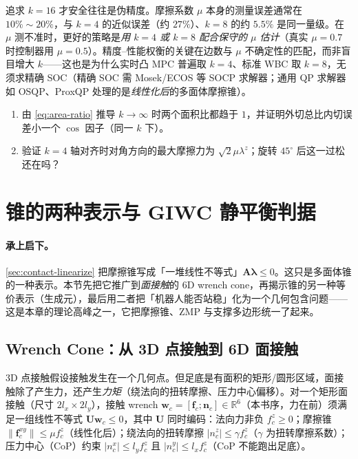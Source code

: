 \begin{insight}
追求 $k=16$ 才安全往往是伪精度。摩擦系数 $\mu$ 本身的测量误差通常在 $10\%\sim20\%$，与 $k=4$ 的近似误差（约 $27\%$）、$k=8$ 的约 $5.5\%$ 是同一量级。在 $\mu$ 测不准时，更好的策略是\emph{用 $k=4$ 或 $k=8$ 配合保守的 $\mu$ 估计}（真实 $\mu=0.7$ 时控制器用 $\mu=0.5$）。精度--性能权衡的关键在边数与 $\mu$ 不确定性的匹配，而非盲目增大 $k$——这也是为什么实时凸 MPC 普遍取 $k=4$、标准 WBC 取 $k=8$，无须求精确 SOC（精确 SOC 需 Mosek/ECOS 等 SOCP 求解器；通用 QP 求解器如 OSQP、ProxQP 处理的是\emph{线性化后}的多面体摩擦锥）。
\end{insight}

\begin{practice}
\begin{enumerate}
  \item 由 \cref{eq:area-ratio} 推导 $k\to\infty$ 时两个面积比都趋于 $1$，并证明外切总比内切误差小一个 $\cos$ 因子（同一 $k$ 下）。
  \item 验证 $k=4$ 轴对齐时对角方向的最大摩擦力为 $\sqrt2\mu\lambda^z$；旋转 $45^\circ$ 后这一过松还在吗？
\end{enumerate}
\end{practice}

\section{锥的两种表示与 GIWC 静平衡判据}
\label{sec:contact-cone-giwc}

\paragraph{承上启下。}
\cref{sec:contact-linearize} 把摩擦锥写成「一堆线性不等式」$\mathbf{A}\boldsymbol{\lambda}\le0$。这只是多面体锥的一种表示。本节先把它推广到\emph{面接触}的 6D wrench cone，再揭示锥的另一种等价表示（生成元），最后用二者把「机器人能否站稳」化为一个几何包含问题——这是本章的理论高峰之一，它把摩擦锥、ZMP 与支撑多边形统一了起来。

\subsection{Wrench Cone：从 3D 点接触到 6D 面接触}
\label{subsec:wrench-cone}

3D 点接触假设接触发生在一个几何点。但足底是有面积的矩形/圆形区域，面接触除了产生力，还产生\emph{力矩}（绕法向的扭转摩擦、压力中心偏移）。对一个矩形面接触（尺寸 $2l_x\times2l_y$），接触 wrench $\boldsymbol{w}_c=[\boldsymbol{f}_c;\boldsymbol{n}_c]\in\mathbb{R}^6$（本书序，力在前）须满足一组线性不等式 $\mathbf{U}\boldsymbol{w}_c\le0$，其中 $\mathbf{U}$ 同时编码：法向力非负 $f_c^z\ge0$；摩擦锥 $\|\boldsymbol{f}_c^{xy}\|\le\mu f_c^z$（线性化后）；绕法向的扭转摩擦 $|n_c^z|\le\gamma f_c^z$（$\gamma$ 为扭转摩擦系数）；压力中心（CoP）约束 $|n_c^x|\le l_y f_c^z$ 且 $|n_c^y|\le l_x f_c^z$（CoP 不能跑出足底）。

